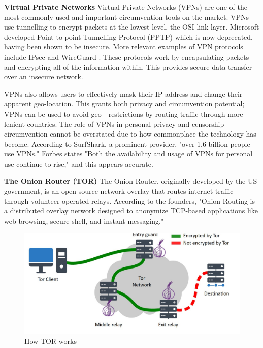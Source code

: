 \textbf{Virtual Private Networks}
Virtual Private Networks (VPNs) are one of the most commonly used and important circumvention tools on the market. VPNs use tunnelling to encrypt packets at the lowest level, the OSI link layer. Microsoft developed Point-to-point Tunnelling Protocol (PPTP) which is now deprecated, having been shown to be insecure. \cite{microsoft_ptpt} More relevant examples of VPN protocols include IPsec \cite{rfc6071} and WireGuard \cite{wireguard_docs}. These protocols work by encapsulating packets and encrypting all of the information within. This provides secure data transfer over an insecure network. \cite{vpn_secure_connection2020} 

VPNs also allows users to effectively mask their IP address and change their apparent geo-location. This grants both privacy and circumvention potential; VPNs can be used to avoid geo - restrictions by routing traffic through more lenient countries. The role of VPNs in personal privacy and censorship circumvention cannot be overstated due to how commonplace the technology has become. According to SurfShark, a prominent provider, "over 1.6 billion people use VPNs." \cite{surfshark_vpn_users} Forbes states "Both the availability and usage of VPNs for personal use continue to rise," and this appears accurate. \cite{forbes_vpn_stats}

\textbf{The Onion Router (TOR)}
The Onion Router, originally developed by the US government, is an open-source network overlay that routes internet traffic through volunteer-operated relays. According to the founders, "Onion Routing is a distributed overlay network designed to anonymize TCP-based applications like web browsing, secure shell, and instant messaging." \cite{dingledine2004tor}

\begin{figure}
  \centering
  \includegraphics[width=\textwidth]{Circumvention Tools/How tor works.jpg}
  \caption{How TOR works}
  \label{fig:your_label_here}
\end{figure}

